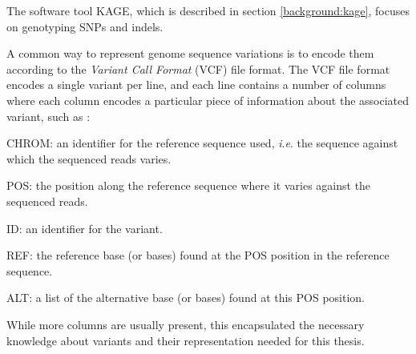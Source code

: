 The software tool KAGE, which is described in section \ref{background:kage}, focuses on genotyping SNPs and indels.

A common way to represent genome sequence variations is to encode them according to the \textit{Variant Call Format} (VCF) file format.
The VCF file format encodes a single variant per line, and each line contains a number of columns where each column encodes a particular piece of information about the associated variant, such as \cite{vcf}:
\begin{compactenum}
  \item
    CHROM: an identifier for the reference sequence used, \textit{i}.\textit{e}. the sequence against which the sequenced reads varies.
  \item
    POS: the position along the reference sequence where it varies against the sequenced reads.
  \item
    ID: an identifier for the variant.
  \item
    REF: the reference base (or bases) found at the POS position in the reference sequence.
  \item
    ALT: a list of the alternative base (or bases) found at this POS position.
\end{compactenum}
While more columns are usually present, this encapsulated the necessary knowledge about variants and their representation needed for this thesis.


